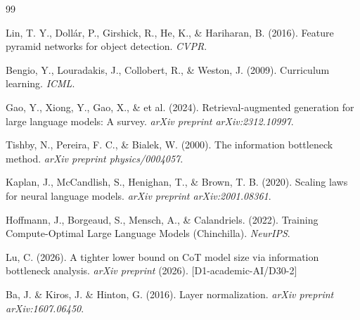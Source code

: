 \documentclass[12pt]{article}
\theoremstyle{definition}
\theoremstyle{remark}
\begin{document}

\begin{thebibliography}{99}

Lin, T. Y., Doll\'ar, P., Girshick, R., He, K., \& Hariharan, B. (2016).
Feature pyramid networks for object detection.
\textit{CVPR}.

Bengio, Y., Louradakis, J., Collobert, R., \& Weston, J. (2009).
Curriculum learning.
\textit{ICML}.

Gao, Y., Xiong, Y., Gao, X., \& et al. (2024).
Retrieval-augmented generation for large language models: A survey.
\textit{arXiv preprint arXiv:2312.10997}.

Tishby, N., Pereira, F. C., \& Bialek, W. (2000).
The information bottleneck method.
\textit{arXiv preprint physics/0004057}.

Kaplan, J., McCandlish, S., Henighan, T., \& Brown, T. B. (2020).
Scaling laws for neural language models.
\textit{arXiv preprint arXiv:2001.08361}.

Hoffmann, J., Borgeaud, S., Mensch, A., \& Calandriels. (2022).
Training Compute-Optimal Large Language Models (Chinchilla).
\textit{NeurIPS}.

Lu, C. (2026).
A tighter lower bound on CoT model size via information bottleneck analysis.
\textit{arXiv preprint} (2026). [D1-academic-AI/D30-2]

Ba, J. \& Kiros, J. \& Hinton, G. (2016).
Layer normalization.
\textit{arXiv preprint arXiv:1607.06450}.

\end{thebibliography}
\end{document}
